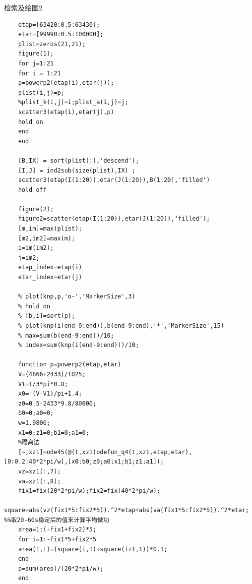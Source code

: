\documentclass{article}
\numberwithin{equation}{subsection}
\begin{document}
检索及绘图2
\begin{lstlisting}
    etap=[63420:0.5:63430];
    etar=[99990:0.5:100000];
    plist=zeros(21,21);
    figure(1);
    for j=1:21
    for i = 1:21
    p=powerp2(etap(i),etar(j));
    plist(i,j)=p;
    %plist_k(i,j)=i;plist_a(i,j)=j;
    scatter3(etap(i),etar(j),p)
    hold on
    end
    end

    [B,IX] = sort(plist(:),'descend');
    [I,J] = ind2sub(size(plist),IX) ;
    scatter3(etap(I(1:20)),etar(J(1:20)),B(1:20),'filled')
    hold off 

    figure(2);
    figure2=scatter(etap(I(1:20)),etar(J(1:20)),'filled');
    [m,im]=max(plist);
    [m2,im2]=max(m);
    i=im(im2);
    j=im2;
    etap_index=etap(i)
    etar_index=etar(j)

    % plot(knp,p,'o-','MarkerSize',3)
    % hold on
    % [b,i]=sort(p);
    % plot(knp(i(end-9:end)),b(end-9:end),'*','MarkerSize',15)
    % max=sum(b(end-9:end))/10;
    % index=sum(knp(i(end-9:end)))/10;

    function p=powerp2(etap,etar)
    V=(4866+2433)/1025; 
    V1=1/3*pi*0.8; 
    x0=-(V-V1)/pi+1.4;
    z0=0.5-2433*9.8/80000;
    b0=0;a0=0;
    w=1.9806;
    x1=0;z1=0;b1=0;a1=0;
    %隔离法
    [~,xz1]=ode45(@(t,xz1)odefun_q4(t,xz1,etap,etar),[0:0.2:40*2*pi/w],[x0;b0;z0;a0;x1;b1;z1;a1]);
    vz=xz1(:,7);
    va=xz1(:,8);
    fix1=fix(20*2*pi/w);fix2=fix(40*2*pi/w);
    square=abs(vz(fix1*5:fix2*5)).^2*etap+abs(va(fix1*5:fix2*5)).^2*etar; %%取20-60s稳定后的值来计算平均做功
    area=1:(-fix1+fix2)*5;
    for i=1:-fix1*5+fix2*5
    area(1,i)=(square(i,1)+square(i+1,1))*0.1;
    end
    p=sum(area)/(20*2*pi/w);
    end
\end{lstlisting}
\end{document}
